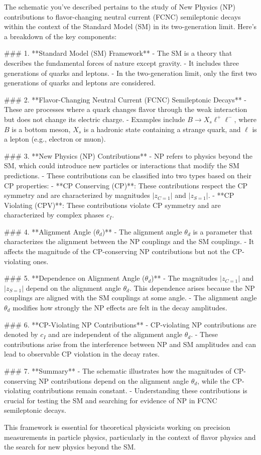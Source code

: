The schematic you've described pertains to the study of New Physics (NP) contributions to flavor-changing neutral current (FCNC) semileptonic decays within the context of the Standard Model (SM) in its two-generation limit. Here's a breakdown of the key components:

### 1. **Standard Model (SM) Framework**
- The SM is a theory that describes the fundamental forces of nature except gravity.
- It includes three generations of quarks and leptons.
- In the two-generation limit, only the first two generations of quarks and leptons are considered.

### 2. **Flavor-Changing Neutral Current (FCNC) Semileptonic Decays**
- These are processes where a quark changes flavor through the weak interaction but does not change its electric charge.
- Examples include \( B \to X_s \ell^+ \ell^- \), where \( B \) is a bottom meson, \( X_s \) is a hadronic state containing a strange quark, and \( \ell \) is a lepton (e.g., electron or muon).

### 3. **New Physics (NP) Contributions**
- NP refers to physics beyond the SM, which could introduce new particles or interactions that modify the SM predictions.
- These contributions can be classified into two types based on their CP properties:
  - **CP Conserving (CP)**: These contributions respect the CP symmetry and are characterized by magnitudes \( |z_{C=1}| \) and \( |z_{S=1}| \).
  - **CP Violating (CPV)**: These contributions violate CP symmetry and are characterized by complex phases \( c_I \).

### 4. **Alignment Angle (\(\theta_d\))**
- The alignment angle \( \theta_d \) is a parameter that characterizes the alignment between the NP couplings and the SM couplings.
- It affects the magnitude of the CP-conserving NP contributions but not the CP-violating ones.

### 5. **Dependence on Alignment Angle (\(\theta_d\))**
- The magnitudes \( |z_{C=1}| \) and \( |z_{S=1}| \) depend on the alignment angle \( \theta_d \). This dependence arises because the NP couplings are aligned with the SM couplings at some angle.
- The alignment angle \( \theta_d \) modifies how strongly the NP effects are felt in the decay amplitudes.

### 6. **CP-Violating NP Contributions**
- CP-violating NP contributions are denoted by \( c_I \) and are independent of the alignment angle \( \theta_d \).
- These contributions arise from the interference between NP and SM amplitudes and can lead to observable CP violation in the decay rates.

### 7. **Summary**
- The schematic illustrates how the magnitudes of CP-conserving NP contributions depend on the alignment angle \( \theta_d \), while the CP-violating contributions remain constant.
- Understanding these contributions is crucial for testing the SM and searching for evidence of NP in FCNC semileptonic decays.

This framework is essential for theoretical physicists working on precision measurements in particle physics, particularly in the context of flavor physics and the search for new physics beyond the SM.